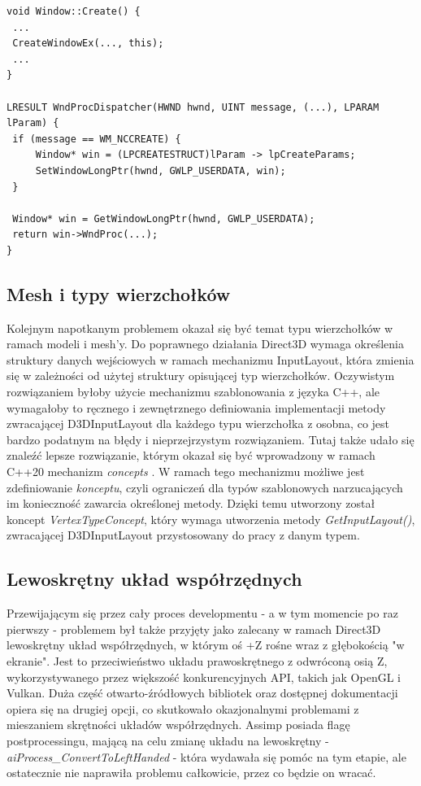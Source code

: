 \begin{lstlisting}[caption={Pseudokod integracji wskaźnika okna z uchwytem HWND}, label={lst:module:WndProcDispatcher}]
void Window::Create() {
 ...
 CreateWindowEx(..., this);
 ...
}

LRESULT WndProcDispatcher(HWND hwnd, UINT message, (...), LPARAM lParam) {
 if (message == WM_NCCREATE) {
     Window* win = (LPCREATESTRUCT)lParam -> lpCreateParams;
     SetWindowLongPtr(hwnd, GWLP_USERDATA, win);
 }
	
 Window* win = GetWindowLongPtr(hwnd, GWLP_USERDATA);
 return win->WndProc(...);
}
\end{lstlisting}

\subsection{Mesh i typy wierzchołków}
Kolejnym napotkanym problemem okazał się być temat typu wierzchołków w ramach modeli i mesh'y. Do poprawnego działania Direct3D wymaga określenia struktury danych wejściowych w ramach mechanizmu InputLayout, która zmienia się w zależności od użytej struktury opisującej typ wierzchołków. Oczywistym rozwiązaniem byłoby użycie mechanizmu szablonowania z języka C++, ale wymagałoby to ręcznego i zewnętrznego definiowania implementacji metody zwracającej D3DInputLayout dla każdego typu wierzchołka z osobna, co jest bardzo podatnym na błędy i nieprzejrzystym rozwiązaniem. Tutaj także udało się znaleźć lepsze rozwiązanie, którym okazał się być wprowadzony w ramach C++20 mechanizm \textit{concepts} \cite{cpp20:concepts:2025}. W ramach tego mechanizmu możliwe jest zdefiniowanie \textit{konceptu}, czyli ograniczeń dla typów szablonowych narzucających im konieczność zawarcia określonej metody. Dzięki temu utworzony został koncept \textit{VertexTypeConcept}, który wymaga utworzenia metody \textit{GetInputLayout()}, zwracającej D3DInputLayout przystosowany do pracy z danym typem.

\subsection{Lewoskrętny układ współrzędnych}
Przewijającym się przez cały proces developmentu - a w tym momencie po raz pierwszy - problemem był także przyjęty jako zalecany w ramach Direct3D lewoskrętny układ współrzędnych, w którym oś +Z rośne wraz z głębokością "w ekranie". Jest to przeciwieństwo układu prawoskrętnego z odwróconą osią Z, wykorzystywanego przez większość konkurencyjnych API, takich jak OpenGL i Vulkan. Duża część otwarto-źródłowych bibliotek oraz dostępnej dokumentacji opiera się na drugiej opcji, co skutkowało okazjonalnymi problemami z mieszaniem skrętności układów współrzędnych. Assimp posiada flagę postprocessingu, mającą na celu zmianę układu na lewoskrętny - \textit{aiProcess\_ConvertToLeftHanded} - która wydawała się pomóc na tym etapie, ale ostatecznie nie naprawiła problemu całkowicie, przez co będzie on wracać.

